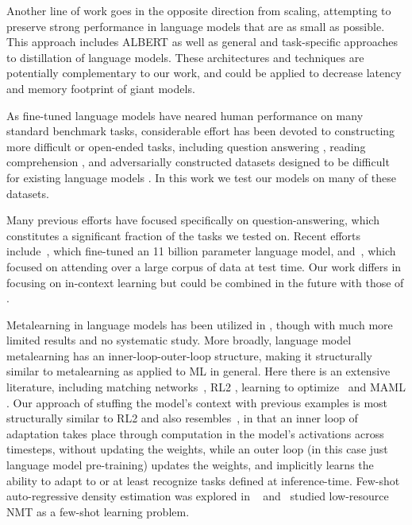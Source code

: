 \documentclass{article}
\begin{document}
Another line of work goes in the opposite direction from scaling, attempting to preserve strong performance in language models that are as small as possible.  This approach includes ALBERT \cite{lan2019albert} as well as general \cite{hinton2015distilling} and task-specific \cite{sanh2019distilbert,jiao2019tinybert,yoon2016sequencedistil} approaches to distillation of language models.  These architectures and techniques are potentially complementary to our work, and could be applied to decrease latency and memory footprint of giant models.

As fine-tuned language models have neared human performance on many standard benchmark tasks, considerable effort has been devoted to constructing more difficult or open-ended tasks, including question answering \cite{Kwiatkowski2019nq,Iyyer2014quiz, Clark2018ThinkYH,Mihaylov2018CanAS}, reading comprehension \cite{choi2018quac,reddy2019coqa}, and adversarially constructed datasets designed to be difficult for existing language models \cite{sakaguchi2019winogrande,nie2019adversarial}.  In this work we test our models on many of these datasets.

Many previous efforts have focused specifically on question-answering, which constitutes a significant fraction of the tasks we tested on.  Recent efforts include~\citep{raffel2019t5, roberts2020much}, which fine-tuned an 11 billion parameter language model, and~\cite{guu2020realm}, which focused on attending over a large corpus of data at test time.  Our work differs in focusing on in-context learning but could be combined in the future with those of \cite{guu2020realm,lewis2020retrieval}.

Metalearning in language models has been utilized in \cite{radford2019language}, though with much more limited results and no systematic study.  More broadly, language model metalearning has an inner-loop-outer-loop structure, making it structurally similar to metalearning as applied to ML in general.  Here there is an extensive literature, including matching networks~\citep{vinyals2016matching}, RL2 \cite{Duan2016RL2FR},  learning to optimize~\citep{ravi2016optimization, andrychowicz2016learning, li2017learning} and MAML \cite{Finn2017ModelAgnosticMF}.  Our approach of stuffing the model’s context with previous examples is most structurally similar to RL2 and also resembles~\cite{hochreiter2001learning}, in that an inner loop of adaptation takes place through computation in the model’s activations across timesteps, without updating the weights, while an outer loop (in this case just language model pre-training) updates the weights, and implicitly learns the ability to adapt to or at least recognize tasks defined at inference-time. Few-shot auto-regressive density estimation was explored in ~\cite{reed2017few} and~\cite{gu2018meta} studied low-resource NMT as a few-shot learning problem.
\end{document}
